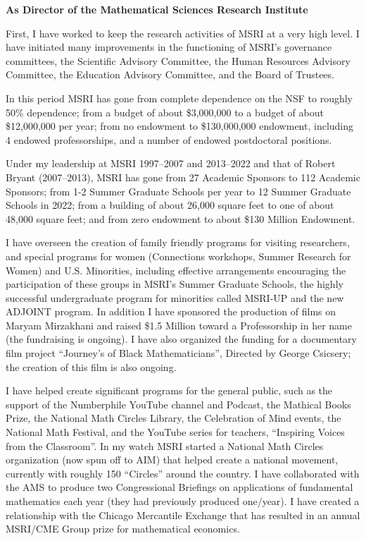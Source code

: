 \medskip
{\bf As Director of the Mathematical Sciences Research Institute}
\smallskip
\item{} 
First, I have worked to keep the research activities of MSRI at a very high level. I have initiated many improvements in the functioning of MSRI's governance committees, the Scientific Advisory Committee, the Human Resources Advisory Committee, the Education Advisory Committee, and  the Board of Trustees.
\smallbreak
\item{} 
In this period MSRI has gone from complete dependence on the NSF to roughly 50\% dependence;  from a budget of about \$3,000,000 to a budget of about \$12,000,000 per year; from no endowment to \$130,000,000 endowment, including 4 endowed professorships, and a number of endowed postdoctoral positions.
\smallbreak
\item{} 
Under my leadership at MSRI 1997--2007 and 2013--2022 and that of Robert Bryant (2007--2013), MSRI has gone from 27 Academic Sponsors to 112 Academic Sponsors; from 1-2 Summer Graduate Schools per year to 12 Summer Graduate Schools in 2022; from a building of about 26,000 square feet to one of about 48,000 square feet; and from zero endowment to about \$130 Million Endowment.
\smallbreak
\item{} 
I have overseen the creation of family friendly programs for visiting researchers, and special programs for women (Connections workshops, Summer Research for Women) and U.S. Minorities, including effective arrangements encouraging the participation of these groups in MSRI's Summer Graduate Schools, the highly successful undergraduate program for minorities called MSRI-UP and the new ADJOINT program. In addition I have sponsored the production of films on Maryam Mirzakhani and  raised \$1.5 Million toward a Professorship in her name (the fundraising is ongoing). I have also organized the funding for a documentary film project ``Journey's of Black Mathematicians'', Directed by George Csicsery; the creation of this film is also ongoing.
\smallbreak
\item{} 
I have helped create significant programs for the general public, such as the support of the Numberphile YouTube channel and Podcast, the Mathical Books Prize, the National Math Circles Library, the Celebration of Mind events, the National Math Festival, and the YouTube series for teachers, ``Inspiring Voices from the Classroom''. In my watch MSRI started a National Math Circles organization (now spun off to AIM) that helped create a national movement, currently with roughly 150 ``Circles'' around the country. I have collaborated with the AMS to produce two Congressional Briefings on applications of fundamental mathematics each year (they had previously produced one/year). I have created a relationship with the Chicago Mercantile Exchange that has resulted in an annual MSRI/CME Group prize for mathematical economics.

